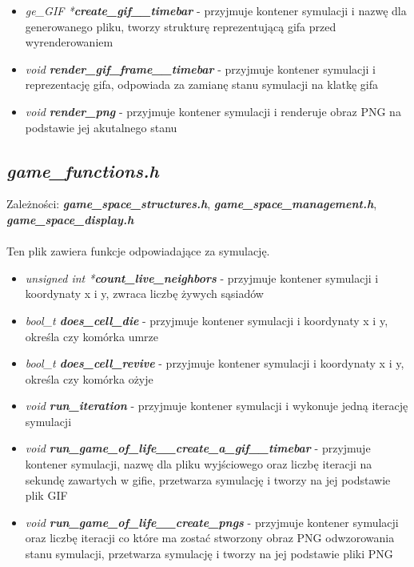 \documentclass[12pt]{article}
\begin{document}
        \begin{itemize}
            \item \textit{ge\_GIF *\textbf{create\_gif\_\_timebar}} - przyjmuje kontener symulacji i nazwę dla generowanego pliku, tworzy strukturę reprezentującą gifa przed wyrenderowaniem
            \item \textit{void \textbf{render\_gif\_frame\_\_timebar}} - przyjmuje kontener symulacji i reprezentację gifa, odpowiada za zamianę stanu symulacji na klatkę gifa
            \item \textit{void \textbf{render\_png}} - przyjmuje kontener symulacji i renderuje obraz PNG na podstawie jej akutalnego stanu
        \end{itemize}


    \subsection{\textbf{\textit{game\_functions.h}}}
        Zależności: \textit{ \textbf{game\_space\_structures.h}}, \textit{ \textbf{game\_space\_management.h}}, \textbf{\textit{game\_space\_display.h}}\\\\
        Ten plik zawiera funkcje odpowiadające za symulację.

        \begin{itemize}
            \item \textit{unsigned int *\textbf{count\_live\_neighbors}} - przyjmuje kontener symulacji i koordynaty x i y, zwraca liczbę żywych sąsiadów
            \item \textit{bool\_t \textbf{does\_cell\_die}} - przyjmuje kontener symulacji i koordynaty x i y, określa czy komórka umrze
            \item \textit{bool\_t \textbf{does\_cell\_revive}} - przyjmuje kontener symulacji i koordynaty x i y, określa czy komórka ożyje
            \item \textit{void \textbf{run\_iteration}} - przyjmuje kontener symulacji i wykonuje jedną iterację symulacji
            \item \textit{void \textbf{run\_game\_of\_life\_\_create\_a\_gif\_\_timebar}} - przyjmuje kontener symulacji, nazwę dla pliku wyjściowego oraz liczbę iteracji na sekundę zawartych w gifie, przetwarza symulację i tworzy na jej podstawie plik GIF
            \item \textit{void \textbf{run\_game\_of\_life\_\_create\_pngs}} - przyjmuje kontener symulacji oraz liczbę iteracji co które ma zostać stworzony obraz PNG odwzorowania stanu symulacji, przetwarza symulację i tworzy na jej podstawie pliki PNG
        \end{itemize}
\end{document}
